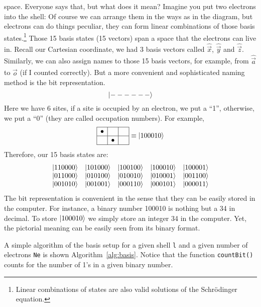 space. Everyone says that, but what does it mean? Imagine you put two electrons
into the shell: Of course we can arrange them in the ways as in the diagram, but
electrons can do things peculiar, they can form linear combinations of those basis
states.\footnote{Linear combinations of states are also valid solutions of the Schr\"{o}dinger equation.}
Those 15 basis states (15 vectors) span a space that the electrons can live in. Recall our Cartesian
coordinate, we had 3 basis vectors called $\hat{\vec{x}}$, $\hat{\vec{y}}$ and $\hat{\vec{z}}$.
Similarly, we can also assign names to those 15 basis vectors, for example, from $\hat{\vec{a}}$
to $\hat{\vec{o}}$ (if I counted correctly). But a more convenient and sophisticated
naming method is the bit representation.
\begin{equation*}
\Ket{-----\,-}
\end{equation*}
Here we have 6 sites, if a site is occupied by an electron, we put a ``1'',
otherwise, we put a ``0'' (they are called occupation numbers). For example,
\begin{equation}
\begin{array}{|c|c|c|}
\hline
\bullet & \phantom{\bullet} & \phantom{\bullet} \\ \hline
 & \bullet &  \\
\hline
\end{array}
\equiv \Ket{100010}
\end{equation}
%
Therefore, our 15 basis states are:
\begin{equation*}
\begin{array}{c c c c c}
\Ket{110000} & \Ket{101000} & \Ket{100100} & \Ket{100010} & \Ket{100001} \\
\Ket{011000} & \Ket{010100} & \Ket{010010} & \Ket{010001} & \Ket{001100} \\
\Ket{001010} & \Ket{001001} & \Ket{000110} & \Ket{000101} & \Ket{000011}
\end{array}
\end{equation*}
%
The bit representation is convenient in the sense that they can be easily
stored in the computer. For instance, a binary number 100010 is nothing but a 34 in decimal.
To store $\Ket{100010}$ we simply store an integer 34 in the computer.
Yet, the pictorial meaning can be easily seen from its binary format.

A simple algorithm of the basis setup for a given shell \texttt{l} and a
given number of electrons \texttt{Ne} is shown Algorithm~\ref{alg:basis}.
Notice that the function \texttt{countBit()} counts for the number
of 1's in a given binary number.

